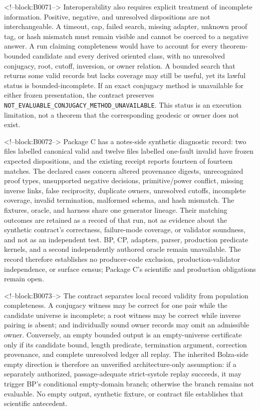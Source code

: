 \documentclass[11pt,a4paper]{article}
\begin{document}
<!--block:B0071-->
Interoperability also requires explicit treatment of incomplete information. Positive, negative, and unresolved dispositions are not interchangeable. A timeout, cap, failed search, missing adapter, unknown proof tag, or hash mismatch must remain visible and cannot be coerced to a negative answer. A run claiming completeness would have to account for every theorem-bounded candidate and every derived oriented class, with no unresolved conjugacy, root, cutoff, inversion, or owner relation. A bounded search that returns some valid records but lacks coverage may still be useful, yet its lawful status is bounded-incomplete. If an exact conjugacy method is unavailable for either frozen presentation, the contract preserves \texttt{NOT\_EVALUABLE\_CONJUGACY\_METHOD\_UNAVAILABLE}. This status is an execution limitation, not a theorem that the corresponding geodesic or owner does not exist.

<!--block:B0072-->
Package C has a notes-side synthetic diagnostic record: two files labelled canonical valid and twelve files labelled one-fault invalid have frozen expected dispositions, and the existing receipt reports fourteen of fourteen matches. The declared cases concern altered provenance digests, unrecognized proof types, unsupported negative decisions, primitive/power conflict, missing inverse links, false reciprocity, duplicate owners, unresolved cutoffs, incomplete coverage, invalid termination, malformed schema, and hash mismatch. The fixtures, oracle, and harness share one generator lineage. Their matching outcomes are retained as a record of that run, not as evidence about the synthetic contract's correctness, failure-mode coverage, or validator soundness, and not as an independent test. BP, CP, adapters, parser, production predicate kernels, and a second independently authored oracle remain unavailable. The record therefore establishes no producer-code exclusion, production-validator independence, or surface census; Package C's scientific and production obligations remain open.

<!--block:B0073-->
The contract separates local record validity from population completeness. A conjugacy witness may be correct for one pair while the candidate universe is incomplete; a root witness may be correct while inverse pairing is absent; and individually sound owner records may omit an admissible owner. Conversely, an empty bounded output is an empty-universe certificate only if its candidate bound, length predicate, termination argument, correction provenance, and complete unresolved ledger all replay. The inherited Bolza-side empty direction is therefore an unverified architecture-only assumption: if a separately authorized, passage-adequate strict-systole replay succeeds, it may trigger BP's conditional empty-domain branch; otherwise the branch remains not evaluable. No empty output, synthetic fixture, or contract file establishes that scientific antecedent.
\end{document}
